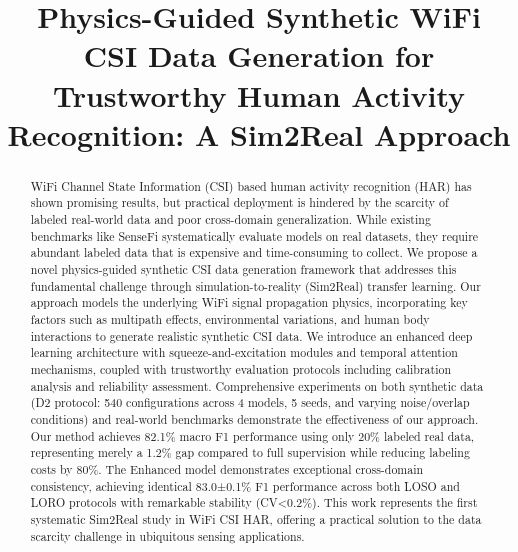 \documentclass[journal]{IEEEtran}
\begin{document}
\title{Physics-Guided Synthetic WiFi CSI Data Generation for Trustworthy Human Activity Recognition: A Sim2Real Approach}

\author{
}

\maketitle

\begin{abstract}
WiFi Channel State Information (CSI) based human activity recognition (HAR) has shown promising results, but practical deployment is hindered by the scarcity of labeled real-world data and poor cross-domain generalization. While existing benchmarks like SenseFi systematically evaluate models on real datasets, they require abundant labeled data that is expensive and time-consuming to collect. We propose a novel physics-guided synthetic CSI data generation framework that addresses this fundamental challenge through simulation-to-reality (Sim2Real) transfer learning. Our approach models the underlying WiFi signal propagation physics, incorporating key factors such as multipath effects, environmental variations, and human body interactions to generate realistic synthetic CSI data. We introduce an enhanced deep learning architecture with squeeze-and-excitation modules and temporal attention mechanisms, coupled with trustworthy evaluation protocols including calibration analysis and reliability assessment. Comprehensive experiments on both synthetic data (D2 protocol: 540 configurations across 4 models, 5 seeds, and varying noise/overlap conditions) and real-world benchmarks demonstrate the effectiveness of our approach. Our method achieves 82.1\% macro F1 performance using only 20\% labeled real data, representing merely a 1.2\% gap compared to full supervision while reducing labeling costs by 80\%. The Enhanced model demonstrates exceptional cross-domain consistency, achieving identical 83.0±0.1\% F1 performance across both LOSO and LORO protocols with remarkable stability (CV<0.2\%). This work represents the first systematic Sim2Real study in WiFi CSI HAR, offering a practical solution to the data scarcity challenge in ubiquitous sensing applications.
\end{abstract}
\end{document}
